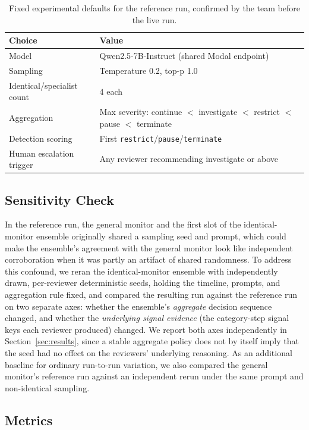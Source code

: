 \documentclass[11pt]{article}
\begin{document}
\begin{table}[h]
\centering
\begin{tabular}{ll}
\toprule
Choice & Value \\
\midrule
Model & Qwen2.5-7B-Instruct (shared Modal endpoint) \\
Sampling & Temperature 0.2, top-p 1.0 \\
Identical/specialist count & 4 each \\
Aggregation & Max severity: continue $<$ investigate $<$ restrict $<$ pause $<$ terminate \\
Detection scoring & First \texttt{restrict}\slash\texttt{pause}\slash\texttt{terminate} \\
Human escalation trigger & Any reviewer recommending investigate or above \\
\bottomrule
\end{tabular}
\caption{Fixed experimental defaults for the reference run, confirmed by the team before the live run.}
\label{tab:defaults}
\end{table}

\subsection{Sensitivity Check}
\label{sec:sensitivity-check}

In the reference run, the general monitor and the first slot of the
identical-monitor ensemble originally shared a sampling seed and prompt,
which could make the ensemble's agreement with the general monitor look like
independent corroboration when it was partly an artifact of shared
randomness. To address this confound, we reran the identical-monitor
ensemble with independently drawn, per-reviewer deterministic seeds, holding
the timeline, prompts, and aggregation rule fixed, and compared the
resulting run against the reference run on two separate axes: whether the
ensemble's \emph{aggregate} decision sequence changed, and whether the
\emph{underlying signal evidence} (the category-step signal keys each
reviewer produced) changed. We report both axes independently in
Section~\ref{sec:results}, since a stable aggregate policy does not by
itself imply that the seed had no effect on the reviewers' underlying
reasoning. As an additional baseline for ordinary run-to-run variation, we
also compared the general monitor's reference run against an independent
rerun under the same prompt and non-identical sampling.

\subsection{Metrics}
\end{document}
